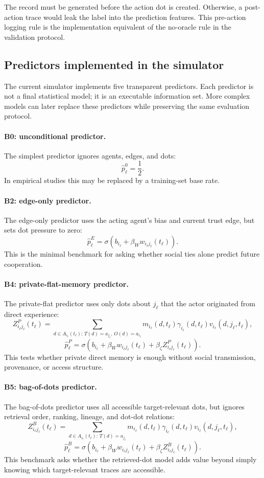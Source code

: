\documentclass[11pt]{article}
\theoremstyle{remark}
\begin{document}
The record must be generated before the action dot is created. Otherwise, a
post-action trace would leak the label into the prediction features. This
pre-action logging rule is the implementation equivalent of the no-oracle rule
in the validation protocol.

\subsection{Predictors implemented in the simulator}\label{predictors-implemented}

The current simulator implements five transparent predictors. Each predictor is
not a final statistical model; it is an executable information set. More complex
models can later replace these predictors while preserving the same evaluation
protocol.

\paragraph{B0: unconditional predictor.}
The simplest predictor ignores agents, edges, and dots:
\[
\widehat p_\ell^0=\frac{1}{2}.
\]
In empirical studies this may be replaced by a training-set base rate.

\paragraph{B2: edge-only predictor.}
The edge-only predictor uses the acting agent's bias and current trust edge, but
sets dot pressure to zero:
\[
\widehat p_\ell^E
=\sigma\left(b_{i_\ell}+\beta_W w_{i_\ell j_\ell}(t_\ell)\right).
\]
This is the minimal benchmark for asking whether social ties alone predict
future cooperation.

\paragraph{B4: private-flat-memory predictor.}
The private-flat predictor uses only dots about $j_\ell$ that the actor
originated from direct experience:
\[
Z_{i_\ell j_\ell}^{P}(t_\ell)
=
\sum_{d\in A_{i_\ell}(t_\ell):\,T(d)=a_{j_\ell},\,O(d)=a_{i_\ell}}
 m_{i_\ell}(d,t_\ell)\gamma_{i_\ell}(d,t_\ell)v_{i_\ell}(d,j_\ell,t_\ell),
\]
\[
\widehat p_\ell^P
=\sigma\left(b_{i_\ell}+\beta_W w_{i_\ell j_\ell}(t_\ell)+
\beta_\zeta Z_{i_\ell j_\ell}^{P}(t_\ell)\right).
\]
This tests whether private direct memory is enough without social
transmission, provenance, or access structure.

\paragraph{B5: bag-of-dots predictor.}
The bag-of-dots predictor uses all accessible target-relevant dots, but ignores
retrieval order, ranking, lineage, and dot-dot relations:
\[
Z_{i_\ell j_\ell}^{B}(t_\ell)
=
\sum_{d\in A_{i_\ell}(t_\ell):\,T(d)=a_{j_\ell}}
 m_{i_\ell}(d,t_\ell)\gamma_{i_\ell}(d,t_\ell)v_{i_\ell}(d,j_\ell,t_\ell),
\]
\[
\widehat p_\ell^B
=\sigma\left(b_{i_\ell}+\beta_W w_{i_\ell j_\ell}(t_\ell)+
\beta_\zeta Z_{i_\ell j_\ell}^{B}(t_\ell)\right).
\]
This benchmark asks whether the retrieved-dot model adds value beyond simply
knowing which target-relevant traces are accessible.
\end{document}
